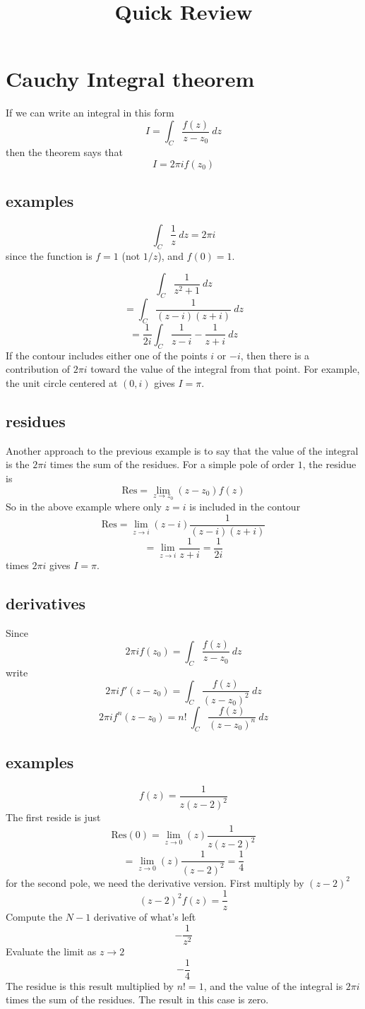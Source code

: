 \documentclass[11pt, oneside]{article}   	%
\title{Quick Review}
\date{}							%
\begin{document}
\maketitle
\Large
\section*{Cauchy Integral theorem}
If we can write an integral in this form 
\[ I = \int_C \frac{f(z)}{z - z_0} \ dz \]
then the theorem says that
\[ I = 2 \pi i f(z_0) \]
\subsection*{examples}
\[ \int_C \frac{1}{z} \ dz = 2 \pi i \]
since the function is $f = 1$ (not $1/z$), and $f(0) = 1$.

\[ \int_C \frac{1}{z^2 + 1} \ dz \]
\[ = \int_C \frac{1}{(z - i)(z + i)} \ dz \]
\[ = \frac{1}{2i} \int_C \frac{1}{z - i} - \frac{1}{z + i} \ dz \]
If the contour includes either one of the points $i$ or $-i$, then there is a contribution of $2 \pi i$ toward the value of the integral from that point.  For example, the unit circle centered at $(0,i)$ gives $I = \pi$.

\subsection*{residues}
Another approach to the previous example is to say that the value of the integral is the $2 \pi i$ times the sum of the residues.  For a simple pole of order $1$, the residue is
\[ \text{Res} = \lim_{z \rightarrow z_0} (z - z_0) f(z) \]
So in the above example where only $z = i$ is included in the contour 
\[ \text{Res} = \lim_{z \rightarrow i} (z - i) \frac{1}{(z - i)(z + i)}  \]
\[ = \lim_{z \rightarrow i} \frac{1}{z + i} = \frac{1}{2i} \]
times $2 \pi i$ gives $I = \pi$.

\subsection*{derivatives}
Since
\[ 2 \pi i f(z_0) = \int_C \frac{f(z)}{z - z_0} \ dz \]
write
\[ 2 \pi i f'(z-z_0) = \int_C \frac{f(z)}{(z - z_0)^2} \ dz \]
\[ 2 \pi i f^n(z-z_0) = n! \ \int_C \frac{f(z)}{(z - z_0)^n} \ dz \]

\subsection*{examples}
\[ f(z) = \frac{1}{z(z-2)^2} \]
The first reside is just 
\[ \text{Res}(0) = \lim_{z \rightarrow 0} (z) \frac{1}{z(z-2)^2} \]
\[ = \lim_{z \rightarrow 0} (z) \frac{1}{(z-2)^2} = \frac{1}{4} \]
for the second pole, we need the derivative version.  First multiply by $(z-2)^2$
\[ (z-2)^2 f(z) = \frac{1}{z} \]
Compute the $N - 1$ derivative of what's left
\[ - \frac{1}{z^2} \]
Evaluate the limit as $z \rightarrow 2$
\[ - \frac{1}{4} \]
The residue is this result multiplied by $n! = 1$, and the value of the integral is $2 \pi i$ times the sum of the residues.  The result in this case is zero.
\end{document}
